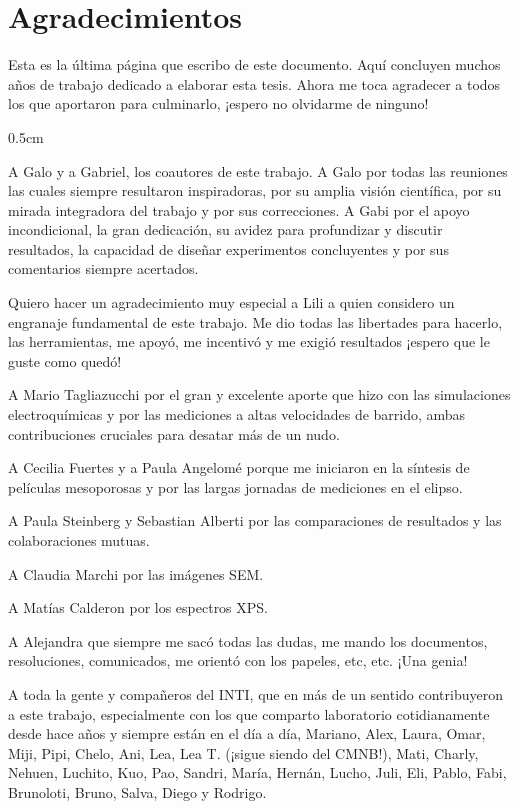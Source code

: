 \vfill
\cleardoublepage

\mtcaddchapter[Agradecimientos]	

\section*{\centering Agradecimientos} 

 \noindent Esta es la última página que escribo de este documento. Aquí concluyen muchos años de trabajo dedicado a elaborar esta tesis. Ahora me toca agradecer a todos los que aportaron para culminarlo, ¡espero no olvidarme de ninguno!

	 \begin{sangria_pers}{0.5cm}

	 A Galo y a Gabriel, los coautores de este trabajo. A Galo por todas las reuniones las cuales siempre resultaron inspiradoras, por su amplia visión científica, por su mirada integradora del trabajo y por sus correcciones. \linebreak A Gabi por el apoyo incondicional, la gran dedicación, su avidez para profundizar y discutir resultados, la capacidad de diseñar experimentos concluyentes y por sus comentarios siempre acertados.

	 Quiero hacer un agradecimiento muy especial a Lili a quien considero un engranaje fundamental de este trabajo. Me dio todas las libertades para hacerlo, las herramientas, me apoyó, me incentivó y me exigió resultados ¡espero que le guste como quedó!

	 A Mario Tagliazucchi por el gran y excelente aporte que hizo con las simulaciones electroquímicas y por las mediciones a altas velocidades de barrido, ambas contribuciones cruciales para desatar más de un nudo.  

	 A Cecilia Fuertes y a Paula Angelomé porque me iniciaron en la síntesis de películas mesoporosas y por las largas jornadas de mediciones en el elipso.

	 A Paula Steinberg y Sebastian Alberti por las comparaciones de resultados y las colaboraciones mutuas.

	 A Claudia Marchi por las imágenes SEM.

	 A Matías Calderon por los espectros XPS.

	 A Alejandra que siempre me sacó todas las dudas, me mando los documentos, resoluciones, comunicados, me orientó con los papeles, etc, etc. ¡Una genia!

	 A toda la gente y compañeros del INTI, que en más de un sentido contribuyeron a este trabajo, especialmente con los que comparto laboratorio cotidianamente desde hace años y siempre están en el día a día, Mariano, Alex, Laura, Omar, Miji, Pipi, Chelo, Ani, Lea, Lea T. (¡sigue siendo del CMNB!), Mati, Charly, Nehuen, Luchito, Kuo, Pao, Sandri, María, Hernán, Lucho, Juli, Eli, Pablo, Fabi, Brunoloti, Bruno, Salva, Diego y Rodrigo.


\end{sangria_pers}
